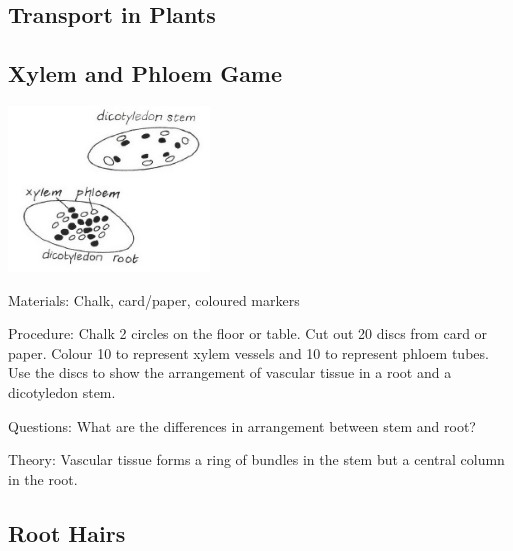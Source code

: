 \begin{multicols}{2}

\section*{Transport in Plants}


\subsection{Xylem and Phloem Game} %

\begin{center}
\includegraphics[width=0.4\textwidth]{./img/vso/xylem-phloem.jpg}
\end{center}

\begin{description*}
\item[Materials:]{Chalk, card/paper, coloured markers}
\item[Procedure:]{Chalk 2 circles on the floor or
table. Cut out 20 discs from card
or paper. Colour 10 to represent
xylem vessels and 10 to represent
phloem tubes. Use the discs
to show the arrangement of
vascular tissue in a root and a
dicotyledon stem.}
\item[Questions:]{What are the differences in arrangement between stem and root?}
\item[Theory:]{Vascular tissue forms a ring of bundles in the stem but a central column in the root.}
\end{description*}

\subsection{Root Hairs} %


\end{multicols}
